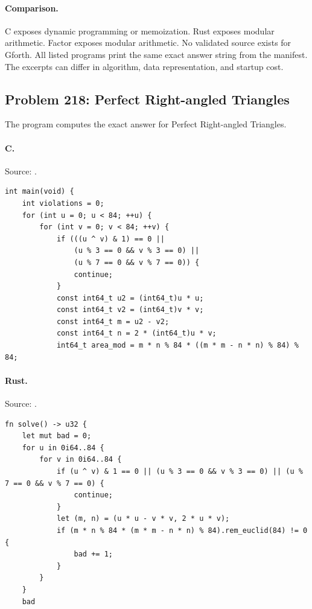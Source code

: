 \paragraph{Comparison.}
C exposes dynamic programming or memoization. Rust exposes modular arithmetic. Factor exposes modular arithmetic.
No validated source exists for Gforth.
All listed programs print the same exact answer string from the manifest. The excerpts can differ in algorithm, data representation, and startup cost.

\subsection{Problem 218: Perfect Right-angled Triangles}
\label{walkthrough:p218}
The program computes the exact answer for Perfect Right-angled Triangles.

\paragraph{C.} Source: .
\begin{lstlisting}
int main(void) {
    int violations = 0;
    for (int u = 0; u < 84; ++u) {
        for (int v = 0; v < 84; ++v) {
            if (((u ^ v) & 1) == 0 ||
                (u % 3 == 0 && v % 3 == 0) ||
                (u % 7 == 0 && v % 7 == 0)) {
                continue;
            }
            const int64_t u2 = (int64_t)u * u;
            const int64_t v2 = (int64_t)v * v;
            const int64_t m = u2 - v2;
            const int64_t n = 2 * (int64_t)u * v;
            int64_t area_mod = m * n % 84 * ((m * m - n * n) % 84) % 84;
\end{lstlisting}

\paragraph{Rust.} Source: .
\begin{lstlisting}
fn solve() -> u32 {
    let mut bad = 0;
    for u in 0i64..84 {
        for v in 0i64..84 {
            if (u ^ v) & 1 == 0 || (u % 3 == 0 && v % 3 == 0) || (u % 7 == 0 && v % 7 == 0) {
                continue;
            }
            let (m, n) = (u * u - v * v, 2 * u * v);
            if (m * n % 84 * (m * m - n * n) % 84).rem_euclid(84) != 0 {
                bad += 1;
            }
        }
    }
    bad
\end{lstlisting}

